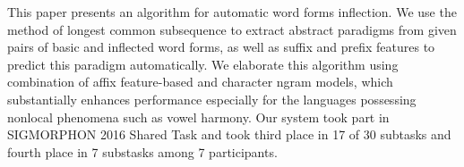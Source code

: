This paper presents an algorithm for automatic word forms inflection. We use the method of longest common subsequence to extract abstract paradigms from given pairs of basic and inflected word forms, as well as suffix and prefix features to predict this paradigm automatically. We elaborate this algorithm using combination of affix feature-based and character ngram models, which substantially enhances performance especially for the languages possessing nonlocal phenomena such as vowel harmony. Our system took part in SIGMORPHON 2016 Shared Task and took third place in 17 of 30 subtasks and fourth place in 7 substasks among 7 participants.
